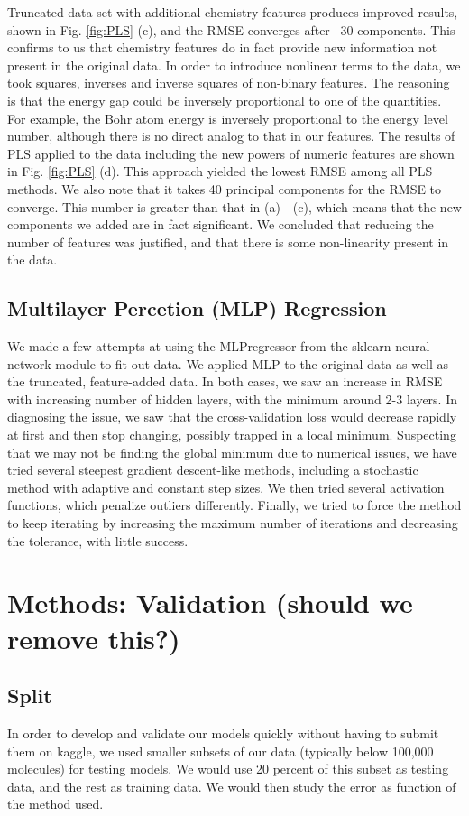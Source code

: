 \documentclass[11pt]{article}
\begin{document}
Truncated data set with additional chemistry features produces improved results, shown in Fig. \ref{fig:PLS} (c), and the RMSE converges after ~30 components. This confirms to us that chemistry features do in fact provide new information not present in the original data. In order to introduce nonlinear terms to the data, we took squares, inverses and inverse squares of non-binary features. The reasoning is that the energy gap could be inversely proportional to one of the quantities. For example, the Bohr atom energy is inversely proportional to the energy level number, although there is no direct analog to that in our features. The results of PLS applied to the data including the new powers of numeric features are shown in Fig. \ref{fig:PLS} (d). This approach yielded the lowest RMSE among all PLS methods. We also note that it takes 40 principal components for the RMSE to converge. This number is greater than that in (a) - (c), which means that the new components we added are in fact significant. We concluded that reducing the number of features was justified, and that there is some non-linearity present in the data.

\subsection{Multilayer Percetion (MLP) Regression}

We made a few attempts at using the MLPregressor from the sklearn neural network module to fit out data. We applied MLP to the original data as well as the truncated, feature-added data. In both cases, we saw an increase in RMSE with increasing number of hidden layers, with the minimum around 2-3 layers. In diagnosing the issue, we saw that the cross-validation loss would decrease rapidly at first and then stop changing, possibly trapped in a local minimum. Suspecting that we may not be finding the global minimum due to numerical issues, we have tried several steepest gradient descent-like methods, including a stochastic method with adaptive and constant step sizes. We then tried several activation functions, which penalize outliers differently. Finally, we tried to force the method to keep iterating by increasing the maximum number of iterations and decreasing the tolerance, with little success. 

\section{Methods: Validation (should we remove this?)}
    \subsection{Split}
In order to develop and validate our models quickly without having to submit them on kaggle, we used smaller subsets of our data (typically below 100,000 molecules) for testing models. We would use 20 percent of this subset as testing data, and the rest as training data. We would then study the error as function of the method used. 
\end{document}
